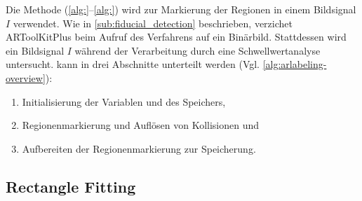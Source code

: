 Die Methode  (\autoref{alg:}--\autoref{alg:}) wird zur Markierung der Regionen in
 einem Bildsignal $I$ verwendet. Wie in \autoref{sub:fiducial_detection} beschrieben, verzichet ARToolKitPlus beim
 Aufruf des Verfahrens auf ein Binärbild. Stattdessen wird ein Bildsignal $I$ während der Verarbeitung durch eine
 Schwellwertanalyse untersucht.  kann in drei Abschnitte unterteilt werden
 (Vgl. \autoref{alg:arlabeling-overview}):

\begin{enumerate}
	\item Initialisierung der Variablen und des Speichers, \label{label-init}
	\item Regionenmarkierung und Auflösen von Kollisionen und \label{label-region}
	\item Aufbereiten der Regionenmarkierung zur Speicherung. \label{label-cleaning}
\end{enumerate}




\subsection{Rectangle Fitting} %
\label{sec:rectangle_fitting}



